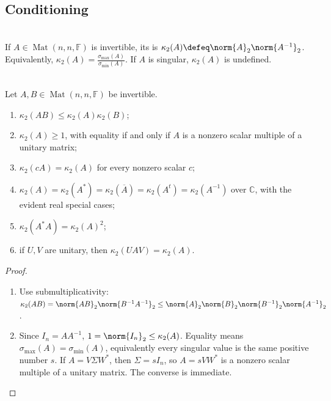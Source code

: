 \subsection{Conditioning}

\begin{definition} \label{def:spectral-condition-number} \\
If $A\in\operatorname{Mat}(n,n,\mathbb{F})$ is invertible, its  is $\kappa_2(A)\defeq\norm{A}_2\norm{A^{-1}}_2$.\\
Equivalently, $\kappa_2(A)=\frac{\sigma_{\max}(A)}{\sigma_{\min}(A)}$. If $A$ is singular, $\kappa_2(A)$ is undefined.
\end{definition}

\begin{proposition} \label{prop:spectral-condition-number-properties} \\
Let $A,B\in\operatorname{Mat}(n,n,\mathbb{F})$ be invertible.
\begin{enumerate}[label=(\roman*)]
\setlength{\itemsep}{0pt}
\item $\kappa_2(AB)\leq\kappa_2(A)\kappa_2(B)$;
\item $\kappa_2(A)\geq1$, with equality if and only if $A$ is a nonzero scalar multiple of a unitary matrix;
\item $\kappa_2(cA)=\kappa_2(A)$ for every nonzero scalar $c$;
\item $\kappa_2(A)=\kappa_2(A^*)=\kappa_2(\overline{A})=\kappa_2(A^t)=\kappa_2(A^{-1})$ over $\mathbb{C}$, with the evident real special cases;
\item $\kappa_2(A^*A)=\kappa_2(A)^2$;
\item if $U,V$ are unitary, then $\kappa_2(UAV)=\kappa_2(A)$.
\end{enumerate}
\begin{proof}
\begin{enumerate}[label=(\roman*)]
\setlength{\itemsep}{0pt}
\item Use submultiplicativity: $\kappa_2(AB)=\norm{AB}_2\norm{B^{-1}A^{-1}}_2\leq\norm{A}_2\norm{B}_2\norm{B^{-1}}_2\norm{A^{-1}}_2$.
\item Since $I_n=AA^{-1}$, $1=\norm{I_n}_2\leq\kappa_2(A)$. Equality means $\sigma_{\max}(A)=\sigma_{\min}(A)$, equivalently every singular value is the same positive number $s$. If $A=V\Sigma W^*$, then $\Sigma=sI_n$, so $A=sVW^*$ is a nonzero scalar multiple of a unitary matrix. The converse is immediate.

\end{enumerate}
\end{proof}
\end{proposition}
